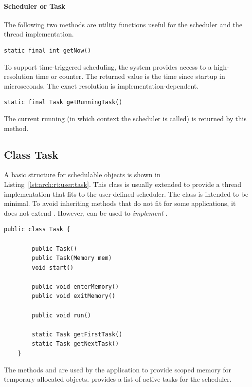 \paragraph{Scheduler or Task}

The following two methods are utility functions useful for the
scheduler and the thread implementation.

\begin{lstlisting}[emph=getNow]
static final int getNow()
\end{lstlisting}
To support time-triggered scheduling, the system provides access to
a high-resolution time or counter. The returned value is the time
since startup in microseconds. The exact resolution is
implementation-dependent.

\begin{lstlisting}[emph=getRunningTask]
static final Task getRunningTask()
\end{lstlisting}
The current running  (in which context the scheduler is
called) is returned by this method.

\subsection{Class Task}

A basic structure for schedulable objects is shown in
Listing~\ref{lst:arch:rt:user:task}. This class is usually extended
to provide a thread implementation that fits to the user-defined
scheduler. The class  is intended to be minimal. To avoid
inheriting methods that do not fit for some applications, it does
not extend . However,  can be used
to \emph{implement} .

\begin{lstlisting}[float,caption=A basic schedulable object,
label=lst:arch:rt:user:task, emph={Task, start, enterMemory,
exitMemory,run,getFirstTask,getNextTask}]
    public class Task {

        public Task()
        public Task(Memory mem)
        void start()

        public void enterMemory()
        public void exitMemory()

        public void run()

        static Task getFirstTask()
        static Task getNextTask()
    }
\end{lstlisting}

The methods  and  are used by the
application to provide scoped memory for temporary allocated
objects.  provides a list of active tasks for the
scheduler.

